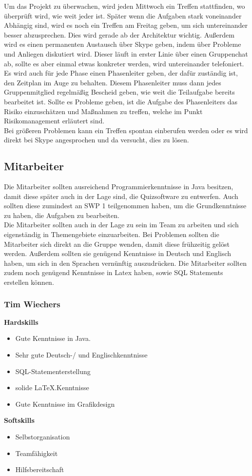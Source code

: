 \documentclass[fontsize=12pt,paper=a4,twoside]{scrartcl}
\begin{document}
Um das Projekt zu überwachen, wird jeden Mittwoch ein Treffen stattfinden, wo überprüft wird, wie weit jeder ist. Später wenn die Aufgaben stark voneinander Abhängig sind, wird es noch ein Treffen am Freitag geben, um sich untereinander besser abzusprechen. Dies wird gerade ab der Architektur wichtig. Außerdem wird es einen permanenten Austausch über Skype geben, indem über Probleme und Anliegen diskutiert wird. Dieser läuft in erster Linie über einen Gruppenchat ab, sollte es aber einmal etwas konkreter werden, wird untereinander telefoniert. \\
Es wird auch für jede Phase einen Phasenleiter geben, der dafür zuständig ist, den Zeitplan im Auge zu behalten. Diesem Phasenleiter muss dann jedes Gruppenmitglied regelmäßig Bescheid geben, wie weit die Teilaufgabe bereits bearbeitet ist. Sollte es Probleme geben, ist die Aufgabe des Phasenleiters das Risiko einzuschätzen und Maßnahmen zu treffen, welche im Punkt Risikomanagement erläutert sind.\\
Bei größeren Problemen kann ein Treffen spontan einberufen werden oder es wird direkt bei Skype angesprochen und da versucht, dies zu lösen.

\subsection{Mitarbeiter}

Die Mitarbeiter sollten ausreichend Programmierkenntnisse in Java besitzen, damit diese später auch in der Lage sind, die Quizsoftware zu entwerfen. Auch sollten diese zumindest an SWP 1 teilgenommen haben, um die Grundkenntnisse zu haben, die Aufgaben zu bearbeiten. \\
Die Mitarbeiter sollten auch in der Lage zu sein im Team zu arbeiten und sich eigenständig in Themengebiete einzuarbeiten. Bei Problemen sollten die Mitarbeiter sich direkt an die Gruppe wenden, damit diese frühzeitig gelöst werden. Außerdem sollten sie genügend Kenntnisse in Deutsch und Englisch haben, um sich in den Sprachen vernünftig auszudrücken. Die Mitarbeiter sollten zudem noch genügend Kenntnisse in Latex haben, sowie SQL Statements erstellen können. 

\subsubsection{Tim Wiechers}

\textbf{Hardskills}
\begin{itemize}
\item{Gute Kenntnisse in Java.}
\item{Sehr gute Deutsch-/ und Englischkenntnisse}
\item{SQL-Statementerstellung}
\item{solide \LaTeX.Kenntnisse}
\item{Gute Kenntnisse im Grafikdesign}
\end{itemize}
\textbf{Softskills}
\begin{itemize}
\item{Selbstorganisation}
\item{Teamfähigkeit}
\item{Hilfsbereitschaft}
\end{itemize}
\end{document}
